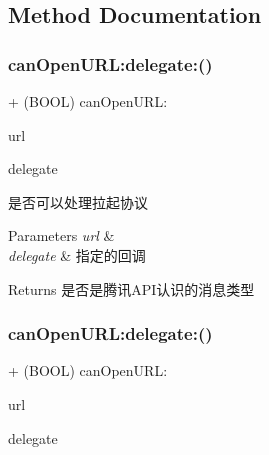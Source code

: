 \subsection{Method Documentation}
\mbox{\label{interface_tencent_api_interface_a83503ce75857d63f305322e0632ffea3}} 
\subsubsection{\texorpdfstring{can\+Open\+U\+R\+L\+:delegate\+:()}{canOpenURL:delegate:()}\hspace{0.1cm}{\footnotesize\ttfamily [1/2]}}
{\footnotesize\ttfamily + (B\+O\+OL) can\+Open\+U\+R\+L\+: \begin{DoxyParamCaption}\item[{(N\+S\+U\+RL $\ast$)}]{url }\item[{delegate:(id$<$ Tencent\+Api\+Interface\+Delegate $>$)}]{delegate }\end{DoxyParamCaption}}

是否可以处理拉起协议 
\begin{DoxyParams}{Parameters}
{\em url} & \\
\hline
{\em delegate} & 指定的回调 \\
\hline
\end{DoxyParams}
\begin{DoxyReturn}{Returns}
是否是腾讯\+A\+P\+I认识的消息类型 
\end{DoxyReturn}
\mbox{\label{interface_tencent_api_interface_a83503ce75857d63f305322e0632ffea3}} 
\subsubsection{\texorpdfstring{can\+Open\+U\+R\+L\+:delegate\+:()}{canOpenURL:delegate:()}\hspace{0.1cm}{\footnotesize\ttfamily [2/2]}}
{\footnotesize\ttfamily + (B\+O\+OL) can\+Open\+U\+R\+L\+: \begin{DoxyParamCaption}\item[{(N\+S\+U\+RL $\ast$)}]{url }\item[{delegate:(id$<$ Tencent\+Api\+Interface\+Delegate $>$)}]{delegate }\end{DoxyParamCaption}}

